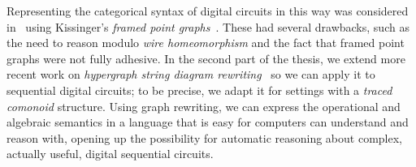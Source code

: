 Representing the categorical syntax of digital circuits in this way was
considered in~\cite{ghica2017diagrammatic} using
Kissinger's \emph{framed point graphs}~\cite{kissinger2012pictures}.
These had several drawbacks, such as the need to reason modulo
\emph{wire homeomorphism} and the fact that framed point graphs were not fully
adhesive.
In the second part of the thesis, we extend more recent work on
\emph{hypergraph string diagram rewriting}~\cite{bonchi2022string,bonchi2022stringa,bonchi2022stringb}
so we can apply it to sequential digital circuits; to be precise, we adapt it
for settings with a \emph{traced comonoid} structure.
Using graph rewriting, we can express the operational and algebraic semantics
in a language that is easy for computers can understand and reason with, opening
up the possibility for automatic reasoning about complex, actually useful,
digital sequential circuits.
